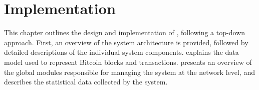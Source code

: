 \chapter{Implementation}\label{ch:implementation}

This chapter outlines the design and implementation of \iblock{}, following a
top-down approach. First, an overview of the system architecture is provided,
followed by detailed descriptions of the individual system components.
 explains the data model used to represent Bitcoin
blocks and transactions.  presents an overview of the
global modules responsible for managing the system at the network level, and
 describes the statistical data collected by the system.








